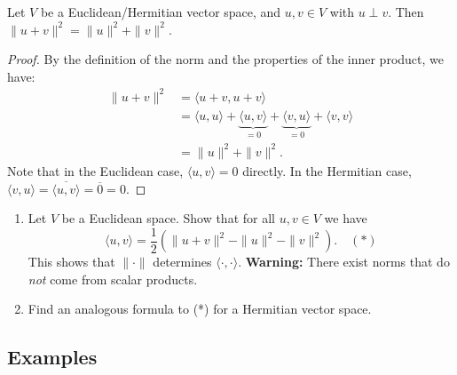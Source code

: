 \begin{theorem}
\label{thm:pythagoras}
Let $V$ be a Euclidean/Hermitian vector space, and $u, v \in V$ with $u \perp v$. Then $\|u + v\|^2 = \|u\|^2 + \|v\|^2$.
\end{theorem}

\begin{proof}
By the definition of the norm and the properties of the inner product, we have:
\begin{align*}
    \|u + v\|^2 &= \langle u + v, u + v \rangle \\
    &= \langle u, u \rangle + \underbrace{\langle u, v \rangle}_{= 0} + \underbrace{\langle v, u \rangle}_{= 0} + \langle v, v \rangle \\
    &= \|u\|^2 + \|v\|^2.
\end{align*}
Note that in the Euclidean case, $\langle u, v \rangle = 0$ directly. In the Hermitian case, $\langle v, u \rangle = \overline{\langle u, v \rangle} = \overline{0} = 0$.
\end{proof}

\begin{exercise}
\label{exc:polarization}
\begin{enumerate}[label=\textbf{(\alph*)}]
    \item \label{exc:reconstruct_scalar_prod} Let $V$ be a Euclidean space. Show that for all $u, v \in V$ we have
    \[
        \langle u, v \rangle = \frac{1}{2}\left(\|u+v\|^2 - \|u\|^2 - \|v\|^2\right). \quad (*)
    \]
    This shows that $\| \cdot \|$ determines $\langle \cdot, \cdot \rangle$. \textbf{Warning:} There exist norms that do \emph{not} come from scalar products.
    \item Find an analogous formula to (*) for a Hermitian vector space.
\end{enumerate}
\end{exercise}

\subsection*{Examples}

